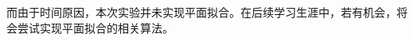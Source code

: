 \documentclass{seuer}
\begin{document}
而由于时间原因，本次实验并未实现平面拟合。在后续学习生涯中，若有机会，将会尝试实现平面拟合的相关算法。




\end{document}
